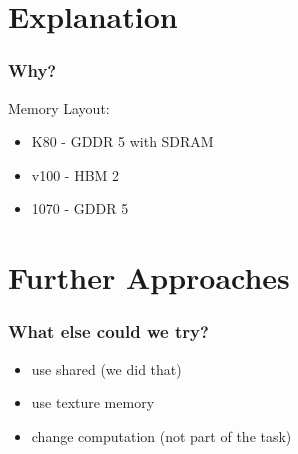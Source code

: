 \documentclass[aspectratio=169]{beamer}
\begin{document}
\begin{frame}
\end{frame}

\section{Explanation}
\begin{frame}
	\frametitle{Why?}
	Memory Layout:
	\begin{itemize}
		\item K80 - GDDR 5 with SDRAM
		\item v100 - HBM 2
		\item 1070 - GDDR 5
	\end{itemize}
\end{frame}

\section{Further Approaches}
\begin{frame}
	\frametitle{What else could we try?}
	\begin{itemize}
		\item use shared (we did that)
		\item use texture memory
		\item change computation (not part of the task)
	\end{itemize}
\end{frame}
\end{document}

